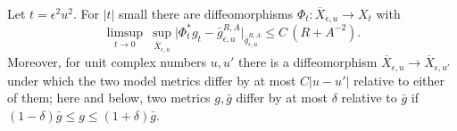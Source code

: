 \begin{lemma}\label{lem:condition-N}
Let $t=\epsilon^2u^2$. For $|t|$ small there are diffeomorphisms
$\Phi_t:\overline X_{\epsilon,u}\to X_t$ with
\begin{equation}\label{eq:condition-N}
 \limsup_{t\to0}\ \sup_{\overline X_{\epsilon,u}}
 \bigl|\Phi_t^*g_t-\bar g_{\epsilon,u}^{R,A}\bigr|_{\bar g_{\epsilon,u}^{R,A}}
 \le C\,(R+A^{-2}).
\end{equation}
Moreover, for unit complex numbers $u,u'$ there is a diffeomorphism
$\overline X_{\epsilon,u}\to\overline X_{\epsilon,u'}$ under which the two
model metrics differ by at most $C|u-u'|$ relative to either of them; here and
below, two metrics $g,\bar g$ differ by at most $\delta$ relative to
$\bar g$ if $(1-\delta)\bar g\le g\le(1+\delta)\bar g$.
\end{lemma}
